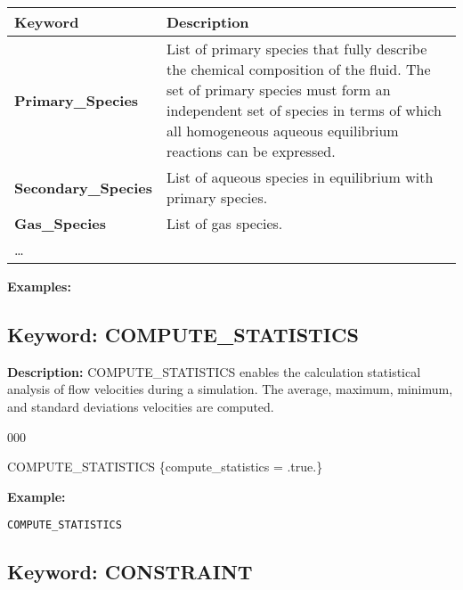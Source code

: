\documentclass[12pt]{article}
\begin{document}
\begin{center}
\begin{tabularx}{\linewidth}{lX}
\toprule
\bf Keyword & \bf Description\\
\midrule
\bf Primary\_Species & List of primary species that fully describe the chemical composition of the fluid. The set of primary species must form an independent set of species in terms of which all homogeneous aqueous equilibrium reactions can be expressed.\\
\midrule
\bf Secondary\_Species & List of aqueous species in equilibrium with primary species.\\
\midrule
\bf Gas\_Species & List of gas species.\\
\midrule
\ldots & \\
\bottomrule
\end{tabularx}
\end{center}

\bigskip

\noindent
{\bf Examples:}


\newpage
\protect\hypertarget{target_stat}{}

\subsection{Keyword: COMPUTE\_STATISTICS}

\noindent
{\bf Description:}
COMPUTE\_STATISTICS enables the calculation statistical analysis of flow velocities during a simulation.  The average, maximum, minimum, and standard deviations velocities are computed.

\begin{deflist}{000}
\item [COMPUTE\_STATISTICS] \{compute\_statistics = .true.\}
\end{deflist}


\noindent
{\bf Example:}
\begin{verbatim}
COMPUTE_STATISTICS
\end{verbatim}


\newpage
\protect\hypertarget{target_constraint}{}

\subsection{Keyword: CONSTRAINT}
\end{document}
